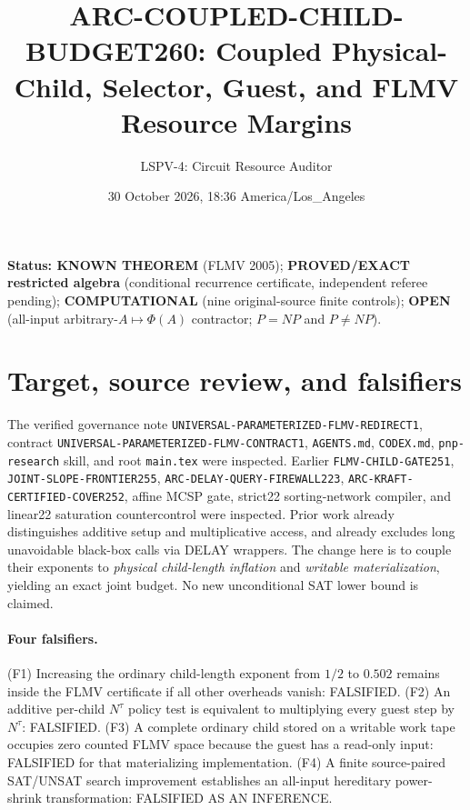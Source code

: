 \documentclass[11pt]{article}
\title{ARC-COUPLED-CHILD-BUDGET260: Coupled Physical-Child, Selector, Guest, and FLMV Resource Margins}
\author{LSPV-4: Circuit Resource Auditor}
\date{30 October 2026, 18:36 America/Los\_Angeles}
\begin{document}
\maketitle
\noindent\textbf{Status: KNOWN THEOREM} (FLMV 2005);
\textbf{PROVED/EXACT restricted algebra} (conditional recurrence certificate, independent referee pending);
\textbf{COMPUTATIONAL} (nine original-source finite controls);
\textbf{OPEN} (all-input arbitrary-$A\mapsto\Phi(A)$ contractor; $P=NP$ and $P\ne NP$).

\section{Target, source review, and falsifiers}
The verified governance note \texttt{UNIVERSAL-PARAMETERIZED-FLMV-REDIRECT1}, contract \texttt{UNIVERSAL-PARAMETERIZED-FLMV-CONTRACT1}, \texttt{AGENTS.md}, \texttt{CODEX.md}, \texttt{pnp-research} skill, and root \texttt{main.tex} were inspected. Earlier \texttt{FLMV-CHILD-GATE251}, \texttt{JOINT-SLOPE-FRONTIER255}, \texttt{ARC-DELAY-QUERY-FIREWALL223}, \texttt{ARC-KRAFT-CERTIFIED-COVER252}, affine MCSP gate, strict22 sorting-network compiler, and linear22 saturation countercontrol were inspected. Prior work already distinguishes additive setup and multiplicative access, and already excludes long unavoidable black-box calls via DELAY wrappers. The change here is to couple their exponents to \emph{physical child-length inflation} and \emph{writable materialization}, yielding an exact joint budget. No new unconditional SAT lower bound is claimed.

\paragraph{Four falsifiers.}
(F1) Increasing the ordinary child-length exponent from $1/2$ to $0.502$ remains inside the FLMV certificate if all other overheads vanish: FALSIFIED. (F2) An additive per-child $N^\tau$ policy test is equivalent to multiplying every guest step by $N^\tau$: FALSIFIED. (F3) A complete ordinary child stored on a writable work tape occupies zero counted FLMV space because the guest has a read-only input: FALSIFIED for that materializing implementation. (F4) A finite source-paired SAT/UNSAT search improvement establishes an all-input hereditary power-shrink transformation: FALSIFIED AS AN INFERENCE.
\end{document}
